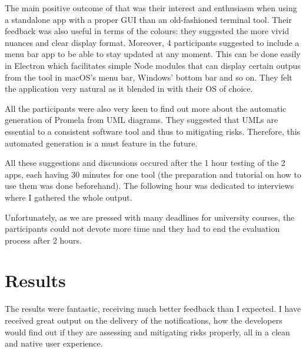 \documentclass[paper=a4, fontsize=11pt]{scrartcl} %
\numberwithin{equation}{section} %
\numberwithin{figure}{section} %
\numberwithin{table}{section} %
\begin{document}
\par
The main positive outcome of that was their interest and enthusiasm when using a standalone app with a proper GUI than
an old-fashioned terminal tool. Their feedback was also useful in terms of the colours: they suggested the more vivid
nuances and clear display format. Moreover, 4 participants suggested to include a menu bar app to be able to stay
updated at any moment. This can be done easily in Electron which facilitates simple Node modules that can display
certain outpus from the tool in macOS's menu bar, Windows' bottom bar and so on. They felt the application very natural
as it blended in with their OS of choice. \\

\par
All the participants were also very keen to find out more about the automatic generation of Promela from UML diagrams. They suggested that UMLs are essential to a consistent software tool and thus to mitigating risks. Therefore, this automated generation is a must feature in the future.\\

\par
All these suggestions and discussions occured after the 1 hour testing of the 2 apps, each having 30 minutes for one tool (the preparation and tutorial on how to use them was done beforehand). The following hour was dedicated to interviews where I gathered the whole output. \\

\par
Unfortunately, as we are pressed with many deadlines for university courses, the participants could not devote more time and they had to end the evaluation process after 2 hours.




\section{Results}

\par
The results were fantastic, receiving much better feedback than I expected. I have received great output on the delivery of the notifications, how the developers would find out if they are assessing and mitigating risks properly, all in a clean and native user experience. \\
\end{document}
